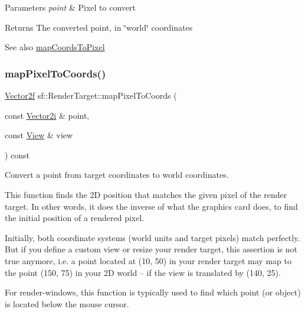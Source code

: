 \begin{DoxyParams}{Parameters}
{\em point} & Pixel to convert\\
\hline
\end{DoxyParams}
\begin{DoxyReturn}{Returns}
The converted point, in \char`\"{}world\char`\"{} coordinates
\end{DoxyReturn}
\begin{DoxySeeAlso}{See also}
\hyperlink{classsf_1_1_render_target_ad92a9f0283aa5f3f67e473c1105b68cf}{map\+Coords\+To\+Pixel} 
\end{DoxySeeAlso}
\mbox{\label{classsf_1_1_render_target_a2d3e9d7c4a1f5ea7e52b06f53e3011f9}} 
\subsubsection{\texorpdfstring{map\+Pixel\+To\+Coords()}{mapPixelToCoords()}\hspace{0.1cm}{\footnotesize\ttfamily [2/2]}}
{\footnotesize\ttfamily \hyperlink{classsf_1_1_vector2}{Vector2f} sf\+::\+Render\+Target\+::map\+Pixel\+To\+Coords (\begin{DoxyParamCaption}\item[{const \hyperlink{classsf_1_1_vector2}{Vector2i} \&}]{point,  }\item[{const \hyperlink{classsf_1_1_view}{View} \&}]{view }\end{DoxyParamCaption}) const}



Convert a point from target coordinates to world coordinates. 

This function finds the 2D position that matches the given pixel of the render target. In other words, it does the inverse of what the graphics card does, to find the initial position of a rendered pixel.

Initially, both coordinate systems (world units and target pixels) match perfectly. But if you define a custom view or resize your render target, this assertion is not true anymore, i.\+e. a point located at (10, 50) in your render target may map to the point (150, 75) in your 2D world -- if the view is translated by (140, 25).

For render-\/windows, this function is typically used to find which point (or object) is located below the mouse cursor.

